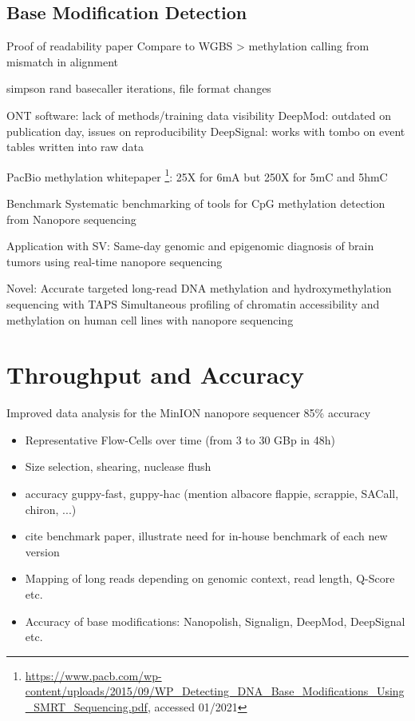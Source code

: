 \subsection{Base Modification Detection}
\label{subsec:state_of_art:basemod}

Proof of readability paper \cite{Schreiber2013}
Compare to WGBS > methylation calling from mismatch in alignment

simpson \cite{Simpson2017}
rand \cite{Rand2017}
basecaller iterations, file format changes

ONT software: lack of methods/training data visibility
DeepMod: outdated on publication day, issues on reproducibility
DeepSignal: works with tombo on event tables written into raw data

PacBio methylation whitepaper \footnote{\url{https://www.pacb.com/wp-content/uploads/2015/09/WP_Detecting_DNA_Base_Modifications_Using_SMRT_Sequencing.pdf}, accessed 01/2021}:
25X for 6mA but 250X for 5mC and 5hmC

Benchmark
Systematic benchmarking of tools for CpG methylation detection from Nanopore sequencing \cite{Yuen2020}

Application with SV:
Same-day genomic and epigenomic diagnosis of brain tumors using real-time nanopore sequencing \cite{Euskirchen2017}

Novel:
Accurate targeted long-read DNA methylation and hydroxymethylation sequencing with TAPS \cite{Liu2020}
Simultaneous profiling of chromatin accessibility and methylation on human cell lines with nanopore sequencing \cite{Lee2020}




\section{Throughput and Accuracy}
\label{sec:stat_of_art:throughput}

Improved data analysis for the {MinION} nanopore sequencer \cite{Jain2015} 85\% accuracy

\begin{itemize}
    \item Representative Flow-Cells over time (from 3 to 30 GBp in 48h)
    \item Size selection, shearing, nuclease flush
    \item accuracy guppy-fast, guppy-hac (mention albacore flappie, scrappie, SACall, chiron, ...)
    \item cite benchmark paper, illustrate need for in-house benchmark of each new version
    \item Mapping of long reads depending on genomic context, read length, Q-Score etc.
    \item Accuracy of base modifications: Nanopolish, Signalign, DeepMod, DeepSignal etc.
\end{itemize}


